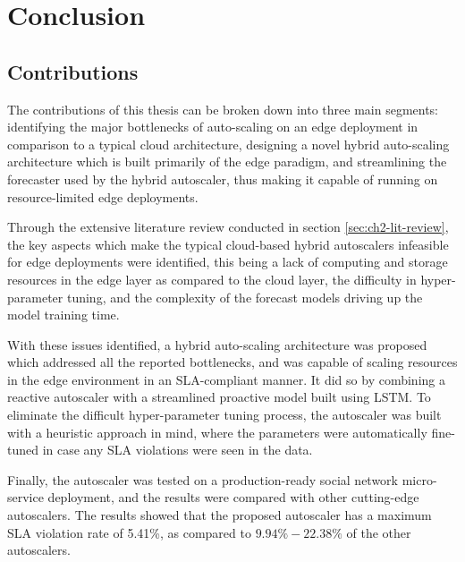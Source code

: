 \clearpage

\def\chaptertitle{Conclusion}

\lhead{\emph{\chaptertitle}}

\chapter{\chaptertitle}
\label{ch:conclusion}

\section{Contributions}
\label{sec:ch6-contribution}

The contributions of this thesis can be broken down into three main segments: identifying the major bottlenecks of auto-scaling on an edge deployment in comparison to a typical cloud architecture, designing a novel hybrid auto-scaling architecture which is built primarily of the edge paradigm, and streamlining the forecaster used by the hybrid autoscaler, thus making it capable of running on resource-limited edge deployments.\par

Through the extensive literature review conducted in section \ref{sec:ch2-lit-review}, the key aspects which make the typical cloud-based hybrid autoscalers infeasible  for edge deployments were identified, this being a lack of computing and storage resources in the edge layer as compared to the cloud layer, the difficulty in hyper-parameter tuning, and the complexity of the forecast models driving up the model training time.\par

With these issues identified, a hybrid auto-scaling architecture was proposed which addressed all the reported bottlenecks, and was capable of scaling resources in the edge environment in an SLA-compliant manner. It did so by combining a reactive autoscaler with a streamlined proactive model built using LSTM. To eliminate the difficult hyper-parameter tuning process, the autoscaler was built with a heuristic approach in mind, where the parameters were automatically fine-tuned in case any SLA violations were seen in the data.\par

Finally, the autoscaler was tested on a production-ready social network micro-service deployment, and the results were compared with other cutting-edge autoscalers. The results showed that the proposed autoscaler has a maximum SLA violation rate of 5.41\%, as compared to $9.94\%-22.38\%$ of the other autoscalers.\par

